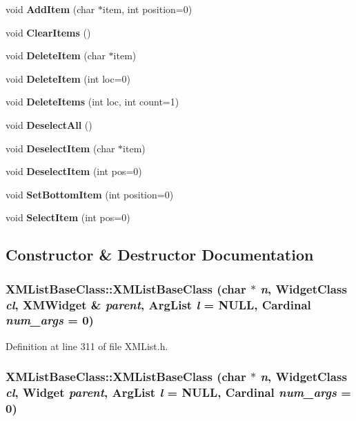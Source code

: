 \begin{CompactItemize}
\item 
void {\bf Add\-Item} (char $\ast$item, int position=0)
\item 
void {\bf Clear\-Items} ()
\item 
void {\bf Delete\-Item} (char $\ast$item)
\item 
void {\bf Delete\-Item} (int loc=0)
\item 
void {\bf Delete\-Items} (int loc, int count=1)
\item 
void {\bf Deselect\-All} ()
\item 
void {\bf Deselect\-Item} (char $\ast$item)
\item 
void {\bf Deselect\-Item} (int pos=0)
\item 
void {\bf Set\-Bottom\-Item} (int position=0)
\item 
void {\bf Select\-Item} (int pos=0)
\end{CompactItemize}


\subsection{Constructor \& Destructor Documentation}
\subsubsection{\setlength{\rightskip}{0pt plus 5cm}XMList\-Base\-Class::XMList\-Base\-Class (char $\ast$ {\em n}, Widget\-Class {\em cl}, {\bf XMWidget} \& {\em parent}, Arg\-List {\em l} = NULL, Cardinal {\em num\_\-args} = 0)\hspace{0.3cm}{\tt  [inline]}}\label{classXMListBaseClass_a0}




Definition at line 311 of file XMList.h.
\subsubsection{\setlength{\rightskip}{0pt plus 5cm}XMList\-Base\-Class::XMList\-Base\-Class (char $\ast$ {\em n}, Widget\-Class {\em cl}, Widget {\em parent}, Arg\-List {\em l} = NULL, Cardinal {\em num\_\-args} = 0)\hspace{0.3cm}{\tt  [inline]}}\label{classXMListBaseClass_a1}




